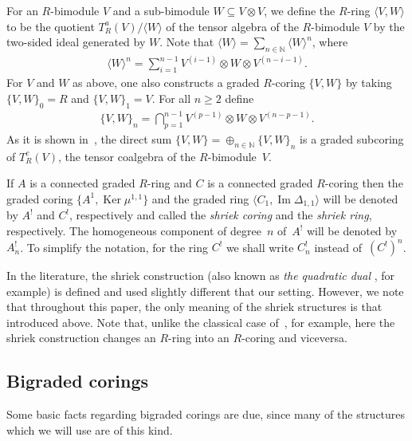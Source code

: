 \documentclass[11pt]{article}
\DeclareMathOperator{\Ker}{Ker}
\DeclareMathOperator{\im}{Im}
\newcommand\ot{\otimes}
\newcommand{\gen}[1]{\langle #1 \rangle}
\newcommand{\br}[1]{\{ #1 \}}
\renewcommand{\^}[1]{\mbox{$^{\left( #1 \right)}$}}
\renewcommand{\_}[1]{\mbox{$_{\left( #1 \right)}$}}
\numberwithin{equation}{section}
\begin{document}
For an $R$-bimodule $V$ and a sub-bimodule $W\subseteq V\ot V$, we def\/ine the $R$-ring $\langle V, W \rangle$ to be the quotient $T^a_R (V)/\langle W \rangle$ of the tensor algebra of the $R$-bimodule $V$ by the two-sided ideal generated by $W$. Note that $\langle W\rangle=\sum\limits_{n\in\mathbb{N}} \langle W\rangle^n$, where
 \begin{gather*}
 \langle W\rangle^n=\sum_{i=1}^{n-1}V^{(i-1)}\ot W\ot V^{ (n-i-1)}. \end{gather*}
For $V$ and $W$ as above, one also constructs a graded $R$-coring $\br{V,W}$ by taking $\br{V,W}_0=R$ and $\br{V,W}_1=V$. For all $n \geq 2$ def\/ine
\begin{gather*}
\br{V,W}_n=\bigcap_{p=1}^{n-1} V^{(p-1)} \otimes W \otimes V^{ (n-p-1)}.
\end{gather*}
As it is shown in~\cite{jps}, the direct sum $\br{V,W}=\oplus_{n \in \mathbb{N}} \br{V,W}_n$ is a graded subcoring of $T^c_R(V)$, the tensor coalgebra of the $R$-bimodule~$V$.

If $A$ is a connected graded $R$-ring and $C$ is a connected graded $R$-coring then the graded coring $\{A^1,\Ker\mu^{1,1}\}$ and the graded ring $\gen{C_1,\im\Delta_{1,1}}$ will be denoted by $A^!$ and $C^!$, respectively and called the \emph{shriek coring} and the \emph{shriek ring}, respectively. The homogeneous component of degree~$n$ of~$A^!$ will be denoted by $A^!_n$. To simplify the notation, for the ring $C^!$ we shall write $C^!_n$ instead of~$(C^!)^n$.

\begin{Remark} In the literature, the shriek construction (also known as \emph{the quadratic dual} \cite[Section~2.8]{bgs}, for example) is def\/ined and used slightly dif\/ferent that our setting. However, we note that throughout this paper, the only meaning of the shriek structures is that introduced above. Note that, unlike the classical case of~\cite{bgs}, for example, here the shriek construction changes an $R$-ring into an $R$-coring and viceversa. \end{Remark}

\subsection{Bigraded corings}
Some basic facts regarding bigraded corings are due, since many of the structures which we will use are of this kind.
\end{document}
